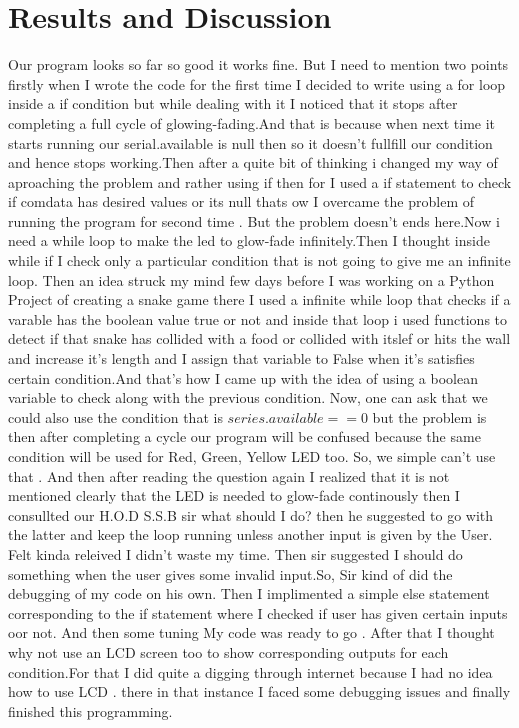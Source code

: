 \documentclass[a4paper]{article}
\begin{document}
\section{Results and Discussion}
Our program looks so far so good it works fine. But I need to mention two points firstly when I wrote the code for the first time I decided to write using a for loop inside a if condition but while dealing with it I noticed that it stops after completing a full cycle of glowing-fading.And that is because when next time it starts running our serial.available is null then so it doesn't fullfill our condition and hence stops working.Then after a quite bit of thinking i changed my way of aproaching the problem and rather using if then for I used a if statement to check if comdata has desired values or its null thats ow I overcame the problem of running the program for second time . But the problem doesn't ends here.Now i need a while loop to make the led to glow-fade infinitely.Then I thought inside while if I check only a particular condition that is not going to give me an infinite loop. Then an idea struck my mind few days before I was working on a Python Project of creating a snake game there I used a infinite while loop that checks if a varable has the boolean value true or not and inside that loop i used functions to detect if that snake has collided with a food or collided with itslef or hits the wall and increase it's length and I assign that variable to False when it's satisfies certain condition.And that's how I came up with the idea of using a boolean variable to check along with the previous condition. Now, one can ask that we could also use the condition that is $ series.available == 0 $ but the problem is then after completing a cycle our program will be confused because the same condition will be used for Red, Green, Yellow LED too. So, we simple can't use that .
And then after reading the question again I realized that it is not mentioned clearly that the LED is needed to glow-fade continously then I consullted our H.O.D S.S.B sir what should I do? then he suggested to go with the latter and keep the loop running unless another input is given by the User. Felt kinda releived I didn't waste my time. Then sir suggested I should do something when the user gives some invalid input.So, Sir kind of did the debugging of my code on his own. Then I implimented a simple else statement corresponding to the if statement where I checked if user has given certain inputs oor not. And then some tuning My code was ready to go . After that I thought why not use an LCD screen too to show corresponding outputs for each condition.For that I did quite a digging through internet because I had no idea how to use LCD . there in that instance I faced some debugging issues and finally finished this programming.
\end{document}
